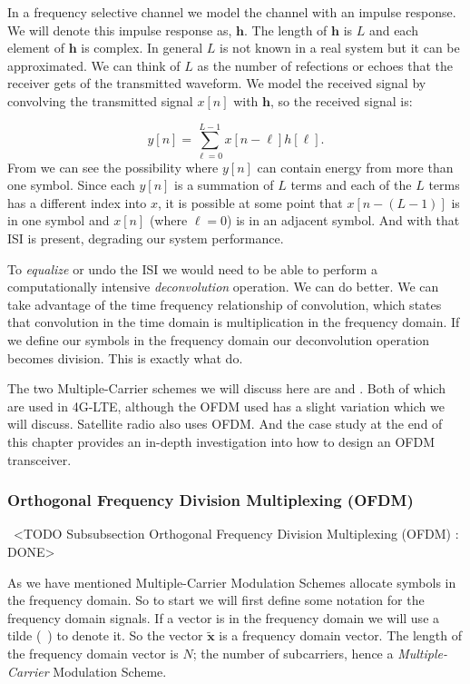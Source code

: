 In a frequency selective channel we model the channel with an impulse response. We will denote this impulse response as, $\mathbf{h}$. The length of $\mathbf{h}$ is $L$ and each element of $\mathbf{h}$ is complex. In general $L$ is not known in a real system but it can be approximated. We can think of $L$ as the number of refections or echoes that the receiver gets of the transmitted waveform. We model the received signal by convolving the transmitted signal $x[n]$ with $\mathbf{h}$, so the received signal is:

\begin{equation}
\label{eq:conv}
y[n] = \sum_{\ell=0}^{L-1}x[n-\ell]h[\ell].
\end{equation}
\noindent
From  we can see the possibility where $y[n]$ can contain energy from more than one symbol. Since each $y[n]$ is a summation of $L$ terms and each of the $L$ terms has a different index into $x$, it is possible at some point that $x[n-(L-1)]$ is in one symbol and $x[n]$ (where $\ell=0$) is in an adjacent symbol. And with that \ac{ISI} is present, degrading our system performance.

To \emph{equalize} or undo the \ac{ISI} we would need to be able to perform a computationally intensive \emph{deconvolution} operation. We can do better. We can take advantage of the time frequency relationship of convolution, which states that convolution in the time domain is multiplication in the frequency domain. If we define our symbols in the frequency domain our deconvolution operation becomes division. This is exactly what  do.

The two Multiple-Carrier schemes we will discuss here are  and . Both of which are used in \ac{4G-LTE}, although the \ac{OFDM} used has a slight variation which we will discuss. Satellite radio also uses \ac{OFDM}. And the case study at the end of this chapter provides an in-depth investigation into how to design an \ac{OFDM} transceiver.

\subsubsection{Orthogonal Frequency Division Multiplexing (OFDM)}
 <TODO Subsubsection Orthogonal Frequency Division Multiplexing (OFDM) : DONE>

As we have mentioned Multiple-Carrier Modulation Schemes allocate symbols in the frequency domain. So to start we will first define some notation for the frequency domain signals. If a vector is in the frequency domain we will use a tilde (~) to denote it. So the vector $\tilde{\mathbf{x}}$ is a frequency domain vector. The length of the frequency domain vector is $N$; the number of subcarriers, hence a \emph{Multiple-Carrier} Modulation Scheme.

